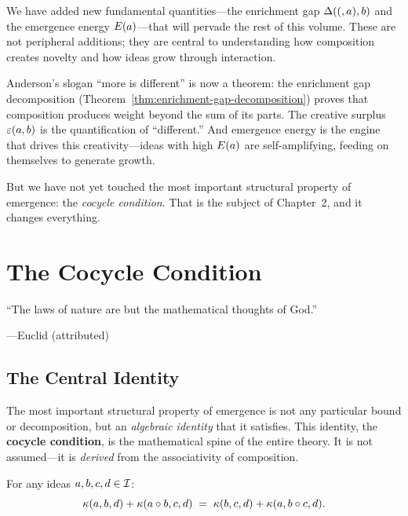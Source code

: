 We have added new fundamental quantities---the enrichment gap $\Delta((,a),b)$
and the emergence energy $E(a)$---that will pervade the rest of this
volume. These are not peripheral additions; they are central to understanding
how composition creates novelty and how ideas grow through interaction.

Anderson's slogan ``more is different'' is now a theorem: the enrichment gap
decomposition (Theorem~\ref{thm:enrichment-gap-decomposition}) proves that
composition produces weight beyond the sum of its parts. The creative surplus
$\varepsilon(a,b)$ is the quantification of ``different.'' And emergence energy
is the engine that drives this creativity---ideas with high $E(a)$ are
self-amplifying, feeding on themselves to generate growth.

But we have not yet touched the most important structural property of emergence:
the \emph{cocycle condition}. That is the subject of Chapter~2, and it changes
everything.



\chapter{The Cocycle Condition}
\label{ch:cocycle}

\epigraph{``The laws of nature are but the mathematical thoughts of God.''}
{---Euclid (attributed)}


\section{The Central Identity}

The most important structural property of emergence is not any particular
bound or decomposition, but an \emph{algebraic identity} that it satisfies.
This identity, the \textbf{cocycle condition}, is the mathematical spine of the
entire theory. It is not assumed---it is \emph{derived} from the associativity of
composition.

\begin{theorem}
\label{thm:cocycle}
For any ideas $a, b, c, d \in \mathcal{I}$:
\[
  \kappa(a, b, d) + \kappa(a \circ b, c, d)
  \;=\; \kappa(b, c, d) + \kappa(a, b \circ c, d).
\]
\end{theorem}

